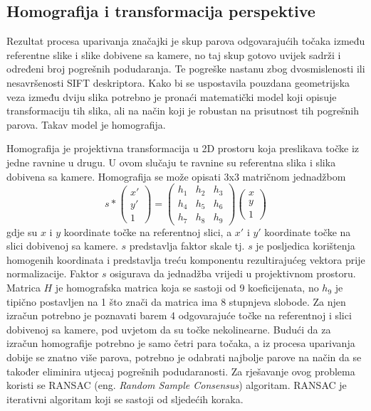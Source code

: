 \subsection{Homografija i transformacija perspektive}

Rezultat procesa uparivanja značajki je skup parova odgovarajućih točaka između referentne slike i slike dobivene sa kamere, no taj skup gotovo uvijek sadrži i određeni broj pogrešnih podudaranja. Te pogreške nastanu zbog dvosmislenosti ili nesavršenosti SIFT deskriptora. Kako bi se uspostavila pouzdana geometrijska veza između dviju slika potrebno je pronaći matematički model koji opisuje transformaciju tih slika, ali na način koji je robustan na prisutnost tih pogrešnih parova. Takav model je homografija. 

Homografija je projektivna transformacija u 2D prostoru koja preslikava točke iz jedne ravnine u drugu. U ovom slučaju te ravnine su referentna slika i slika dobivena sa kamere. Homografija se može opisati 3x3 matričnom jednadžbom
\begin{equation}
    s *
    \begin{pmatrix}
        x' \\
        y' \\
        1
    \end{pmatrix}
    =
    \begin{pmatrix}
        h_1 & h_2 & h_3 \\
        h_4 & h_5 & h_6 \\
        h_7 & h_8 & h_9
    \end{pmatrix}
    \begin{pmatrix}
        x \\
        y \\
        1
    \end{pmatrix}
\end{equation}
gdje su $x$ i $y$ koordinate točke na referentnoj slici, a $x'$ i $y'$ koordinate točke na slici dobivenoj sa kamere. $s$ predstavlja faktor skale tj. $s$ je posljedica korištenja homogenih koordinata i predstavlja treću komponentu rezultirajućeg vektora prije normalizacije. Faktor $s$ osigurava da jednadžba vrijedi u projektivnom prostoru. Matrica $H$ je homografska matrica koja se sastoji od 9 koeficijenata, no $h_9$ je tipično postavljen na 1 što znači da matrica ima 8 stupnjeva slobode. Za njen izračun potrebno je poznavati barem 4 odgovarajuće točke na referentnoj i slici dobivenoj sa kamere, pod uvjetom da su točke nekolinearne.
Budući da za izračun homografije potrebno je samo četri para točaka, a iz procesa uparivanja dobije se znatno više parova, potrebno je odabrati najbolje parove na način da se također eliminira utjecaj pogrešnih podudaranosti. Za rješavanje ovog problema koristi se RANSAC (eng. \textit{Random Sample Consensus}) algoritam. RANSAC je iterativni algoritam koji se sastoji od sljedećih koraka. 
